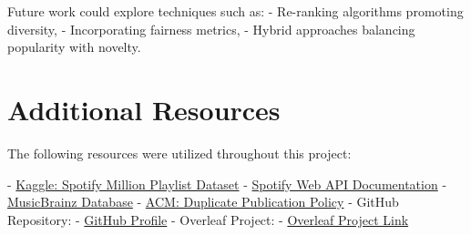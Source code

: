 \documentclass[runningheads]{llncs}
\begin{document}
Future work could explore techniques such as:
- Re-ranking algorithms promoting diversity,
- Incorporating fairness metrics,
- Hybrid approaches balancing popularity with novelty.

\section{Additional Resources}
The following resources were utilized throughout this project:

- \href{https://www.kaggle.com/datasets/shubhendra/million-playlist-dataset}{Kaggle: Spotify Million Playlist Dataset}
- \href{https://developer.spotify.com/documentation/web-api/}{Spotify Web API Documentation}
- \href{https://musicbrainz.org/}{MusicBrainz Database}
- \href{https://www.acm.org/publications/policies/duplicate-publication}{ACM: Duplicate Publication Policy}
- GitHub Repository: 
  - \href{https://github.com/anythonyschomer}{GitHub Profile}
- Overleaf Project: 
  - \href{https://www.overleaf.com/read/mvxxxcdzxrjr#c7bfc4}{Overleaf Project Link} 

\printbibliography[title={References}]

\end{document}
